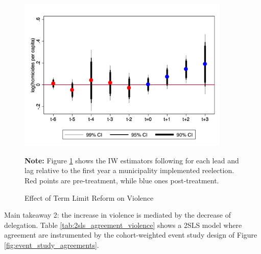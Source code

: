 \documentclass[12pt]{amsart}
\numberwithin{equation}{section}
\theoremstyle{definition}
\theoremstyle{definition}
\theoremstyle{definition}
\begin{document}
\begin{figure}[H] 
\centering
 \caption{Effect of Term Limit Reform on Violence}
 \label{fig:as_violence}
\includegraphics[width=0.9\textwidth]{../Figures/catts_homicides.png}
       \captionsetup{justification=centering}
       
 \textbf{Note:} Figure \ref{fig:as_violence} shows the IW estimators following \citet{abraham_sun_2020} for each lead and lag relative to the first year a municipality implemented reelection. Red points are pre-treatment, while blue ones post-treatment. 
    
\end{figure}    
     
     
     \clearpage 

 Main takeaway 2: the increase in violence is mediated by the decrease of delegation. Table \ref{tab:2sls_agreement_violence} shows a 2SLS model where agreement are instrumented by the cohort-weighted event study design of Figure \ref{fig:event_study_agreements}.  
 
\end{document}

